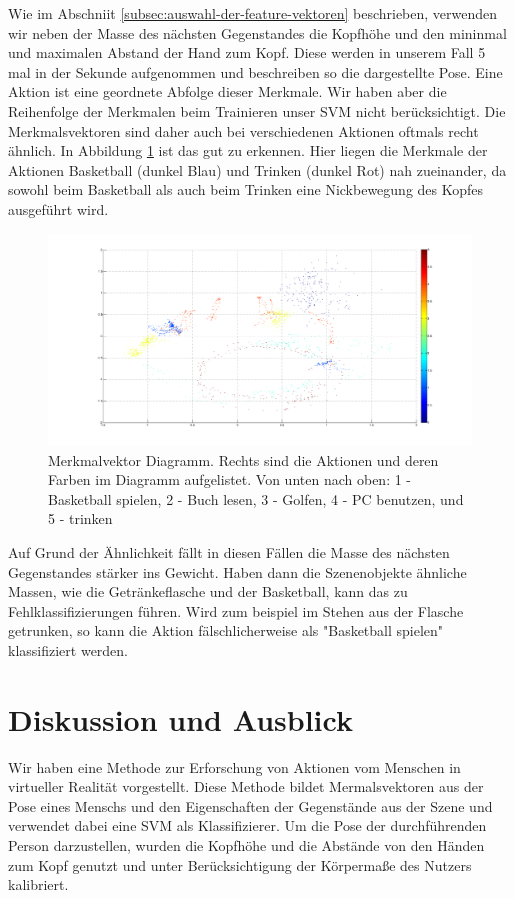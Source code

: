 Wie im Abschniit \ref{subsec:auswahl-der-feature-vektoren} beschrieben, verwenden wir neben der Masse des nächsten Gegenstandes die Kopfhöhe und den mininmal und maximalen Abstand der Hand zum Kopf. Diese werden in unserem Fall 5 mal in der Sekunde aufgenommen und beschreiben so die dargestellte Pose. Eine Aktion ist eine geordnete Abfolge dieser Merkmale. Wir haben aber die Reihenfolge der Merkmalen beim Trainieren unser SVM nicht berücksichtigt. Die Merkmalsvektoren sind daher auch bei verschiedenen Aktionen oftmals recht ähnlich. In Abbildung \ref{fig:Merkmalvektoren-Diagramm} ist das gut zu erkennen. Hier liegen die Merkmale der Aktionen Basketball (dunkel Blau) und Trinken (dunkel Rot) nah zueinander, da sowohl beim Basketball als auch beim Trinken eine Nickbewegung des Kopfes ausgeführt wird.\newline
\begin{figure}[hbtp]
\includegraphics[width=1.0\linewidth]{altefeatures4.png}
\caption{Merkmalvektor Diagramm. Rechts sind die Aktionen und deren Farben im Diagramm aufgelistet. Von unten nach oben: 1 - Basketball spielen, 2 - Buch lesen, 3 - Golfen, 4 - PC benutzen, und 5 - trinken }
\label{fig:Merkmalvektoren-Diagramm}
\end{figure}
Auf Grund der Ähnlichkeit fällt in diesen Fällen die Masse des nächsten Gegenstandes stärker ins Gewicht. Haben dann die Szenenobjekte ähnliche Massen, wie die Getränkeflasche und der Basketball, kann das zu Fehlklassifizierungen führen.  Wird zum beispiel im Stehen aus der Flasche getrunken, so kann die Aktion fälschlicherweise als "Basketball spielen" klassifiziert werden. 

\section{Diskussion und Ausblick}
Wir haben eine Methode zur Erforschung von Aktionen vom Menschen in virtueller Realität vorgestellt. Diese Methode bildet Mermalsvektoren aus der Pose eines Menschs und den Eigenschaften der Gegenstände aus der Szene und verwendet dabei eine SVM als Klassifizierer. Um die Pose der durchführenden Person darzustellen, wurden die Kopfhöhe und die Abstände von den Händen zum Kopf genutzt und unter Berücksichtigung der Körpermaße des Nutzers kalibriert. 



